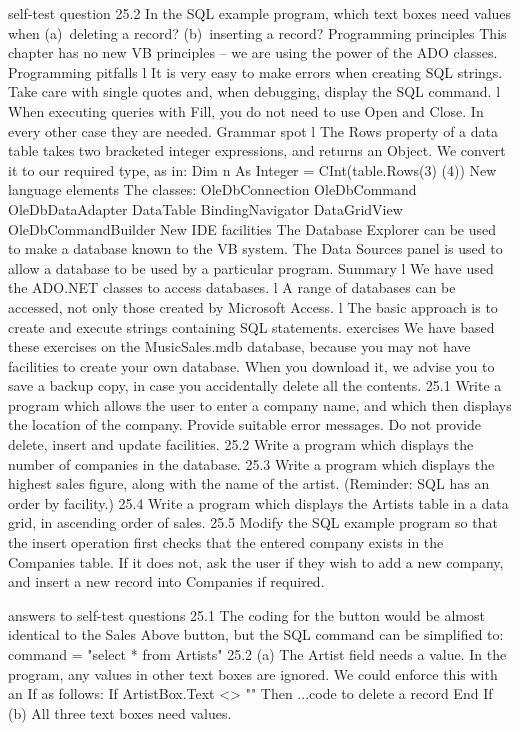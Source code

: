 self-test question
25.2	In the SQL example program, which text boxes need values when
	(a) deleting a record?
	(b) inserting a record?
Programming principles
This chapter has no new VB principles – we are using the power of the ADO classes.
Programming pitfalls
l	It is very easy to make errors when creating SQL strings. Take care with single quotes and, when debugging, display the SQL command.
l	When executing queries with Fill, you do not need to use Open and Close. In every other case they are needed.
Grammar spot
l	The Rows property of a data table takes two bracketed integer expressions, and returns an Object. We convert it to our required type, as in:
Dim n As Integer = CInt(table.Rows(3) (4))
New language elements
The classes:
OleDbConnection
OleDbCommand
OleDbDataAdapter
DataTable
BindingNavigator
DataGridView
OleDbCommandBuilder
New IDE facilities
The Database Explorer can be used to make a database known to the VB system. The Data Sources panel is used to allow a database to be used by a particular program.
Summary
l	We have used the ADO.NET classes to access databases.
l	A range of databases can be accessed, not only those created by Microsoft Access.
l	The basic approach is to create and execute strings containing SQL statements.
exercises
We have based these exercises on the MusicSales.mdb database, because you may not have facilities to create your own database. When you download it, we advise you to save a backup copy, in case you accidentally delete all the contents.
25.1	Write a program which allows the user to enter a company name, and which then displays the location of the company. Provide suitable error messages. Do not provide delete, insert and update facilities.
25.2	Write a program which displays the number of companies in the database.
25.3	Write a program which displays the highest sales figure, along with the name of the artist. (Reminder: SQL has an order by facility.)
25.4	Write a program which displays the Artists table in a data grid, in ascending order of sales.
25.5	Modify the SQL example program so that the insert operation first checks that the entered company exists in the Companies table. If it does not, ask the user if they wish to add a new company, and insert a new record into Companies if required.

answers to self-test questions
25.1	The coding for the button would be almost identical to the Sales Above 
button, but the SQL command can be simplified to:
		command = "select * from Artists"
25.2	(a)	The Artist field needs a value. In the program, any values in other text boxes are ignored. We could enforce this with an If as follows:
		If ArtistBox.Text <> "" Then
			...code to delete a record
		End If
	(b)	All three text boxes need values.
